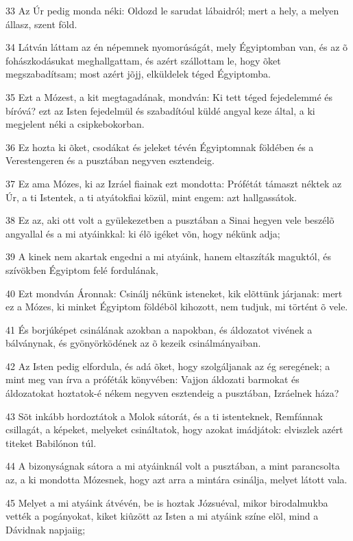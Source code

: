 \par 33 Az Úr pedig monda néki: Oldozd le sarudat lábaidról; mert a hely, a melyen állasz, szent föld.
\par 34 Látván láttam az én népemnek nyomorúságát, mely Égyiptomban van, és az õ fohászkodásukat meghallgattam, és azért szállottam le, hogy õket megszabadítsam; most azért jõjj, elküldelek téged Égyiptomba.
\par 35 Ezt a Mózest, a kit megtagadának, mondván: Ki tett téged fejedelemmé és bíróvá? ezt az Isten fejedelmül és szabadítóul küldé angyal keze által, a ki megjelent néki a  csipkebokorban.
\par 36 Ez hozta ki õket, csodákat és jeleket tévén Égyiptomnak földében és a Verestengeren  és a pusztában negyven esztendeig.
\par 37 Ez ama Mózes, ki az Izráel fiainak ezt mondotta: Prófétát támaszt néktek az Úr, a ti Istentek, a ti atyátokfiai közül, mint engem: azt hallgassátok.
\par 38 Ez az, aki ott volt a gyülekezetben a pusztában a Sinai hegyen vele beszélõ angyallal és a mi atyáinkkal: ki élõ  igéket võn, hogy nékünk adja;
\par 39 A kinek nem akartak engedni a mi atyáink, hanem eltaszíták maguktól, és szívökben Égyiptom felé fordulának,
\par 40 Ezt mondván Áronnak: Csinálj nékünk isteneket, kik elõttünk járjanak: mert ez a Mózes, ki minket Égyiptom földébõl kihozott, nem tudjuk, mi történt õ vele.
\par 41 És borjúképet csinálának azokban a napokban, és áldozatot vivének a bálványnak, és gyönyörködének az õ kezeik csinálmányaiban.
\par 42 Az Isten pedig elfordula, és adá õket, hogy szolgáljanak az ég seregének; a mint meg van írva  a próféták könyvében: Vajjon áldozati barmokat és áldozatokat hoztatok-é nékem negyven esztendeig a pusztában, Izráelnek háza?
\par 43 Sõt inkább hordoztátok a Molok sátorát, és a ti istenteknek, Remfánnak csillagát, a képeket, melyeket csináltatok, hogy azokat imádjátok: elviszlek azért titeket Babilónon túl.
\par 44 A bizonyságnak sátora a mi atyáinknál volt a pusztában, a mint parancsolta az, a ki mondotta Mózesnek, hogy azt arra a mintára csinálja, melyet látott vala.
\par 45 Melyet a mi atyáink átvévén, be is hoztak Józsuéval, mikor birodalmukba vették a pogányokat, kiket kiûzött az Isten a mi atyáink színe elõl, mind a Dávidnak napjaiig;
